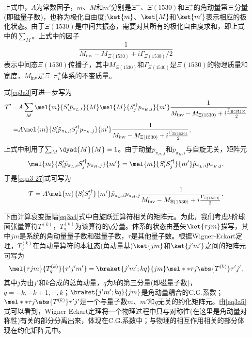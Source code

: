 上式中，$A$为常数因子，$m$、$M$和$m'$分别是$\Xi^{-}$、$\Xi(1530)$和$\Xi_{c}^{+}$的角动量第三分量(即磁量子数)，也称为极化自由度;\;$\ket{m}$、$\ket{M}$和$\ket{m'}$表示相应的极化状态。由于$\Xi(1530)$是中间共振态，需要对其所有的极化自由度求和，即上式中的$\sum_{M}$。上式中的因子
\begin{equation*}
\dfrac{1}{M_{\text{inv}}-M_{\Xi(1530)}+i\Gamma_{\Xi(1530)}/2}
\end{equation*}
表示中间态$\Xi(1530)$传播子，其中$M_{\Xi(1530)}$和$\Gamma_{\Xi(1530)}$是$\Xi(1530)$的物理质量和宽度，$M_{\text{inv}}$是$\Xi^{-}\pi_{L}^{+}$体系的不变质量。\par
式\eqref{eq3a3}可进一步写为
\begin{equation}
	\label{eqn3-27}
\begin{aligned}[b]
	\mathcal{T}'=&A\sum_{M}\mel{m}{S'_{i}\tilde{p}_{\pi_L,i}}{M}\mel{M}{S'^{\dagger}_{j}p_{\pi_H,j}}{m'}\frac{1}{M_{\text{inv}}-M_{\Xi(1530)}+i\frac{\Gamma_{\Xi(1530)}}{2}}\\[1ex]
	=&A\mel{m}{S'_{i}\tilde{p}_{\pi_L,i}S'^{\dagger}_{j}p_{\pi_H,j}}{m'}\frac{1}{M_{\text{inv}}-M_{\Xi(1530)}+i\frac{\Gamma_{\Xi(1530)}}{2}},
\end{aligned}
\end{equation}
上式中利用了$\sum_{M}\dyad{M}{M}=1$。由于动量$p_{\pi_{H},j}$和$\tilde{p}_{\pi_{H},i}$与自旋无关，矩阵元
\begin{equation*}
\mel{m}{S'_{i}\tilde{p}_{\pi_{L},i}S'^{\dagger}_{j}p_{\pi_{H},j}}{m'}=\mel{m}{S'_{i}S'^{\dagger}_{j}}{m'}\tilde{p}_{\pi_{L},i}p_{\pi_{H},j}.
\end{equation*}
于是\eqref{eqn3-27}式可写为
\begin{equation}
\label{eq3a4}
\mathcal{T}=A\mel{m}{S'_{i}S'^{\dagger}_{j}}{m'}\tilde{p}_{\pi_{L},i}p_{\pi_{H},j}\frac{1}{M_{\text{inv}}-M_{\Xi(1530)}+i\frac{\Gamma_{\Xi(1530)}}{2}}.
\end{equation}\par
下面计算衰变振幅\eqref{eq3a4}式中自旋跃迁算符相关的矩阵元。为此，我们考虑$k$阶球面张量算符$T^{(k)}$，$T^{(k)}_{q}$为该算符的$q$分量。体系的状态由基矢$\ket{\tau jm}$描写，其中$jm$是系统的角动量量子数和磁量子数，$\tau$是其他量子数。根据Wigner-Eckart定理\cite{2001高等量子力学}，$T^{(k)}_{q}$在角动量算符的本征态(角动量基)$\ket{jm}$和$\ket{j'm'}$之间的矩阵元可写为
\begin{equation}
\label{eq3a5}
\mel{\tau jm}{T^{(k)}_{q}}{\tau'j'm'}=\braket{j'm';kq}{jm}\mel**{\tau j}{\abs{T^{(k)}}}{\tau'j'},
\end{equation}
其中$j$为由$j'$和$k$合成的总角动量，$q$为$k$的第三分量(即磁量子数)，$q=-k,-k+1,\cdots,k$；$\braket{j'm';kq}{jm}$是角动量耦合的C.G.系数；$\mel**{\tau j}{\abs{T^{(k)}}}{\tau'j'}$是一个与量子数$m$、$m'$和$q$无关的约化矩阵元。由\eqref{eq3a5}式可以看到，Wigner-Eckart定理将一个物理过程中只与对称性(在这里是角动量对称性)有关的部分分离出来，体现在C.G.系数中；与物理的相互作用相关的部分体现在约化矩阵元中。\par
